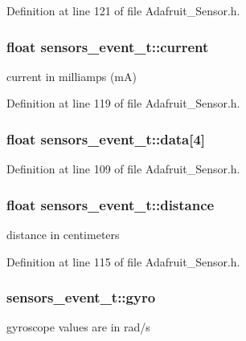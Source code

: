Definition at line 121 of file Adafruit\+\_\+\+Sensor.\+h.

\subsubsection[{\texorpdfstring{current}{current}}]{\setlength{\rightskip}{0pt plus 5cm}float sensors\+\_\+event\+\_\+t\+::current}\hypertarget{structsensors__event__t_ad34303af57d6bce18c34862a887fc005}{}\label{structsensors__event__t_ad34303af57d6bce18c34862a887fc005}
current in milliamps (mA) 

Definition at line 119 of file Adafruit\+\_\+\+Sensor.\+h.

\subsubsection[{\texorpdfstring{data}{data}}]{\setlength{\rightskip}{0pt plus 5cm}float sensors\+\_\+event\+\_\+t\+::data\mbox{[}4\mbox{]}}\hypertarget{structsensors__event__t_addee33a715123e16eb463e5cc9024fe2}{}\label{structsensors__event__t_addee33a715123e16eb463e5cc9024fe2}


Definition at line 109 of file Adafruit\+\_\+\+Sensor.\+h.

\subsubsection[{\texorpdfstring{distance}{distance}}]{\setlength{\rightskip}{0pt plus 5cm}float sensors\+\_\+event\+\_\+t\+::distance}\hypertarget{structsensors__event__t_a456259aaeb265913281d7ffbd8ad8697}{}\label{structsensors__event__t_a456259aaeb265913281d7ffbd8ad8697}
distance in centimeters 

Definition at line 115 of file Adafruit\+\_\+\+Sensor.\+h.

\subsubsection[{\texorpdfstring{gyro}{gyro}}]{ sensors\+\_\+event\+\_\+t\+::gyro}\hypertarget{structsensors__event__t_ad108ea8c3a18d02cfc674ba27e94a2c4}{}\label{structsensors__event__t_ad108ea8c3a18d02cfc674ba27e94a2c4}
gyroscope values are in rad/s 

